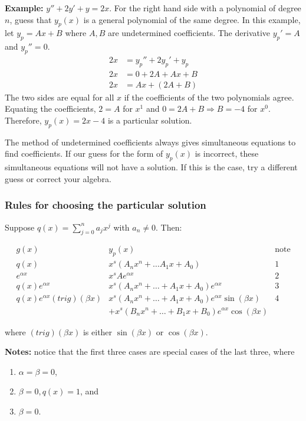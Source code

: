 \documentclass[11pt]{article}
\newcommand{\example}{\textbf{Example: }}
\begin{document}
	\example $y'' + 2y' + y = 2x$. For the right hand side with a polynomial of degree $n$, guess that $y_p(x)$ is a general polynomial of the same degree. In this example, let $y_p = Ax + B$ where $A,B$ are undetermined coefficients. The derivative $y_p' = A$ and $y_p'' = 0$.
		\begin{align*}
			2x &= y_p'' + 2y_p' + y_p \\
			2x &= 0 + 2A + Ax + B \\
			2x &= Ax + (2A + B)
		\end{align*}
	The two sides are equal for all $x$ if the coefficients of the two polynomials agree. Equating the coefficients, $2 = A$ for $x^1$ and $0 = 2A + B \Rightarrow B = -4$ for $x^0$. Therefore, $y_p(x) = 2x - 4$ is a particular solution.

	The method of undetermined coefficients always gives simultaneous equations to find coefficients. If our guess for the form of $y_p(x)$ is incorrect, these simultaneous equations will not have a solution. If this is the case, try a different guess or correct your algebra.

\subsubsection{Rules for choosing the particular solution}
	Suppose $q (x) = \sum_{j = 0}^n a_j x^j$ with $a_n \neq 0$. Then:

	$$ \begin{array}{c|c|c}
		g(x) & y_p(x) & \text{note} \\ \hline
		q(x) & x^s (A_n x^n + \ldots A_1 x + A_0) & 1 \\
		e^{\alpha x} & x^s A e^{\alpha x} & 2 \\
		q(x) e^{\alpha x} & x^s (A_n x^n + \ldots + A_1 x + A_0) e^{\alpha x} & 3 \\
		q(x)e^{\alpha x}(trig)(\beta x) & x^s (A_n x^n + \ldots + A_1 x + A_0) e^{\alpha x} \sin(\beta x) & 4 \\
		 & + x^s (B_n x^n + \ldots + B_1 x + B_0) e^{\alpha x} \cos(\beta x) &
	\end{array} $$

	where $(trig)(\beta x)$ is either $\sin(\beta x)$ or $\cos(\beta x)$.

	\textbf{Notes:} notice that the first three cases are special cases of the last three, where
		\begin{enumerate}
			\item $\alpha = \beta = 0$,
			\item $\beta = 0, q(x) = 1$, and
			\item $\beta = 0$.
		\end{enumerate}
\end{document}
